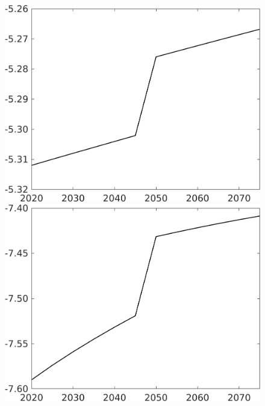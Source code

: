 \documentclass[12pt]{article}
\begin{document}
\begin{figure}[h!!]
\begin{minipage}[]{0.32\textwidth}
	\end{minipage}	
	\begin{minipage}[]{0.32\textwidth}
		\includegraphics[width=1\textwidth]{../../codding_model/own_basedOnFried/optimalPol_010922_revision/figures/all_13Sept22/CompTaufPER_bytaul_Reg0_hl_spillover0_nsk0_xgr1_knspil0_sep0_LFlimit1_emsbase0_countec0_GovRev0_etaa0.79_lgd0.png}
	\end{minipage}	
	\begin{minipage}[]{0.32\textwidth}
		\includegraphics[width=1\textwidth]{../../codding_model/own_basedOnFried/optimalPol_010922_revision/figures/all_13Sept22/CompTaufPER_bytaul_Reg0_C_spillover0_nsk0_xgr1_knspil0_sep0_LFlimit1_emsbase0_countec0_GovRev0_etaa0.79_lgd0.png}

\end{minipage}
\end{figure}
\end{document}
